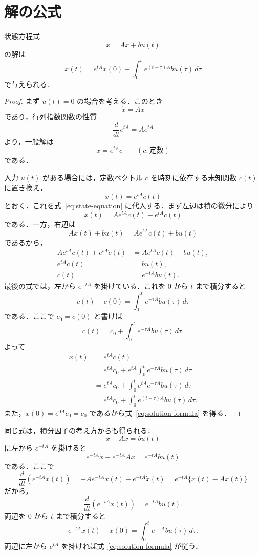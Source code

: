 \documentclass[article,paper=a4paper]{jlreq}
\begin{document}
\section{解の公式}

\begin{prop}
状態方程式
\begin{equation}
  \dot{x}=Ax+bu(t)
  \label{eq:state-equation}
\end{equation}
の解は
\begin{equation}
  x(t)
    =e^{tA}x(0)
      +\int_0^t e^{(t-\tau)A}bu(\tau)\,d\tau
  \label{eq:solution-formula}
\end{equation}
で与えられる．
\end{prop}

\begin{proof}
まず $u(t)=0$ の場合を考える．このとき
\[
  \dot{x}=Ax
\]
であり，行列指数関数の性質
\[
  \frac{d}{dt}e^{tA}=Ae^{tA}
\]
より，一般解は
\[
  x=e^{tA}c
  \qquad (c:\text{定数})
\]
である．

入力 $u(t)$ がある場合には，定数ベクトル $c$ を時刻に依存する未知関数 $c(t)$ に置き換え，
\[
  x(t)=e^{tA}c(t)
\]
とおく．これを式~\eqref{eq:state-equation} に代入する．まず左辺は積の微分により
\[
  \dot{x}(t)
    =Ae^{tA}c(t)+e^{tA}\dot{c}(t)
\]
である．一方，右辺は
\[
  Ax(t)+bu(t)=Ae^{tA}c(t)+bu(t)
\]
であるから，
\begin{align*}
  Ae^{tA}c(t)+e^{tA}\dot{c}(t)
    &=Ae^{tA}c(t)+bu(t),\\
  e^{tA}\dot{c}(t)
    &=bu(t),\\
  \dot{c}(t)
    &=e^{-tA}bu(t).
\end{align*}
最後の式では，左から $e^{-tA}$ を掛けている．これを $0$ から $t$ まで積分すると
\[
  c(t)-c(0)
    =\int_0^t e^{-\tau A}bu(\tau)\,d\tau
\]
である．ここで $c_0=c(0)$ と書けば
\[
  c(t)=c_0+\int_0^t e^{-\tau A}bu(\tau)\,d\tau.
\]
よって
\begin{align*}
  x(t)
    &=e^{tA}c(t)\\
    &=e^{tA}c_0
      +e^{tA}\int_0^t e^{-\tau A}bu(\tau)\,d\tau\\
    &=e^{tA}c_0
      +\int_0^t e^{tA}e^{-\tau A}bu(\tau)\,d\tau\\
    &=e^{tA}c_0
      +\int_0^t e^{(t-\tau)A}bu(\tau)\,d\tau.
\end{align*}
また，$x(0)=e^{0A}c_0=c_0$ であるから式~\eqref{eq:solution-formula} を得る．
\end{proof}

\begin{rem}
同じ式は，積分因子の考え方からも得られる．
\[
  \dot{x}-Ax=bu(t)
\]
に左から $e^{-tA}$ を掛けると
\[
  e^{-tA}\dot{x}-e^{-tA}Ax=e^{-tA}bu(t)
\]
である．ここで
\[
  \frac{d}{dt}\left(e^{-tA}x(t)\right)
    =
    -Ae^{-tA}x(t)+e^{-tA}\dot{x}(t)
    =
    e^{-tA}\{\dot{x}(t)-Ax(t)\}
\]
だから，
\[
  \frac{d}{dt}\left(e^{-tA}x(t)\right)=e^{-tA}bu(t).
\]
両辺を $0$ から $t$ まで積分すると
\[
  e^{-tA}x(t)-x(0)
    =
    \int_0^t e^{-\tau A}bu(\tau)\,d\tau.
\]
両辺に左から $e^{tA}$ を掛ければ式~\eqref{eq:solution-formula} が従う．
\end{rem}
\end{document}
